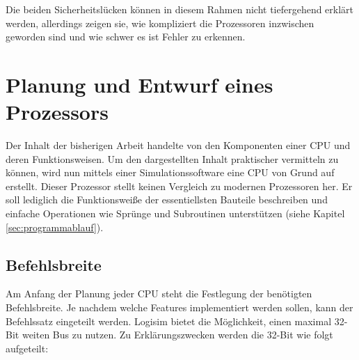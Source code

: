 \documentclass[a4paper,12pt]{article}
\begin{document}
\par\bigskip\noindent Die beiden Sicherheitslücken können in diesem Rahmen nicht tiefergehend erklärt werden, allerdings zeigen sie, wie kompliziert die Prozessoren inzwischen geworden sind und wie schwer es ist Fehler zu erkennen. 


\newpage
\section{Planung und Entwurf eines Prozessors}
Der Inhalt der bisherigen Arbeit handelte von den Komponenten einer CPU und deren Funktionsweisen. Um den dargestellten Inhalt praktischer vermitteln zu können, wird nun mittels einer Simulationssoftware eine CPU von Grund auf erstellt. Dieser Prozessor stellt keinen Vergleich zu modernen Prozessoren her. Er soll lediglich die Funktionsweiße der essentiellsten Bauteile beschreiben und einfache Operationen wie Sprünge und Subroutinen unterstützen (siehe Kapitel \ref{sec:programmablauf}).
\subsection{Befehlsbreite}
Am Anfang der Planung jeder CPU steht die Festlegung der benötigten Befehlsbreite. Je nachdem welche Features implementiert werden sollen, kann der Befehlssatz eingeteilt werden. Logisim bietet die Möglichkeit, einen maximal 32-Bit weiten Bus zu nutzen. Zu Erklärungszwecken werden die 32-Bit wie folgt aufgeteilt:
\end{document}
